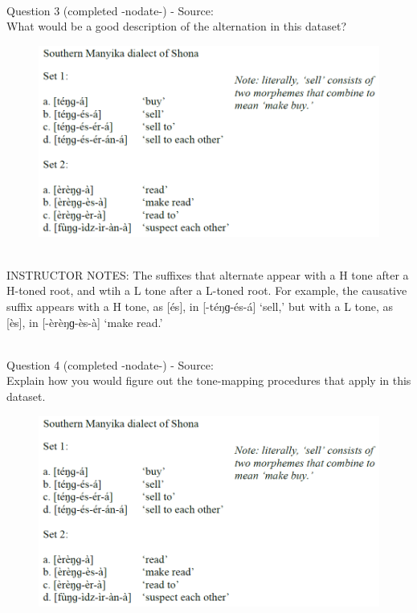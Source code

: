 \documentclass[12pt]{article}
\begin{document}
~\\

{\large Question 3} (completed -nodate-) - Source: \\

What would be a good description of the alternation in this dataset?\\

\begin{figure}[H]
\includegraphics{../images/shona.png}
\end{figure}

~\\
INSTRUCTOR NOTES: The suffixes that alternate appear with a H tone after a H-toned root, and wtih a L tone after a L-toned root. For example, the causative suffix appears with a H tone, as [és], in [-téŋɡ-és-á] ‘sell,’ but with a L tone, as [ès], in [-èrèŋɡ-ès-à] ‘make read.’


~\\

{\large Question 4} (completed -nodate-) - Source: \\

Explain how you would figure out the tone-mapping procedures that apply in this dataset.\\

\begin{figure}[H]
\includegraphics{../images/shona.png}
\end{figure}
\end{document}
